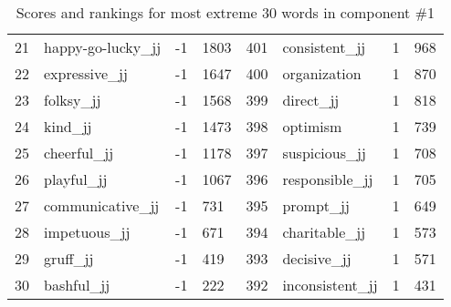 \begin{table}[tbp]
\begin{tabular}{| rlr@{.}l | rlr@{.}l |}
    21 & happy-go-lucky\_jj & -1 & 1803    &    401 & consistent\_jj & 1 & 968 \\
    22 & expressive\_jj & -1 & 1647    &    400 & organization & 1 & 870 \\
    23 & folksy\_jj & -1 & 1568    &    399 & direct\_jj & 1 & 818 \\
    24 & kind\_jj & -1 & 1473    &    398 & optimism & 1 & 739 \\
    25 & cheerful\_jj & -1 & 1178    &    397 & suspicious\_jj & 1 & 708 \\
    26 & playful\_jj & -1 & 1067    &    396 & responsible\_jj & 1 & 705 \\
    27 & communicative\_jj & -1 & 731    &    395 & prompt\_jj & 1 & 649 \\
    28 & impetuous\_jj & -1 & 671    &    394 & charitable\_jj & 1 & 573 \\
    29 & gruff\_jj & -1 & 419    &    393 & decisive\_jj & 1 & 571 \\
    30 & bashful\_jj & -1 & 222    &    392 & inconsistent\_jj & 1 & 431 \\
    \hline
    \end{tabular}
    \caption{Scores and rankings for most extreme 30 words in component \#1} 
\end{table}
\clearpage
